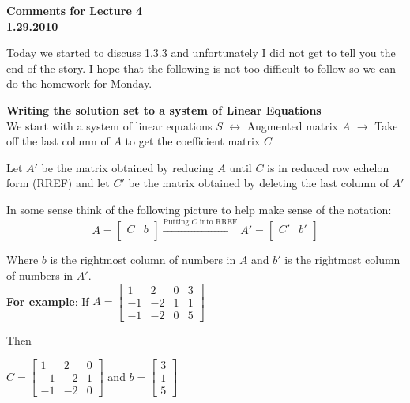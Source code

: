 \documentclass[12pt]{article}
\begin{document}
\begin{center}
{\large \bf Comments for Lecture 4}\\
\bf{1.29.2010}
\end{center}


Today we started to discuss 1.3.3 and unfortunately I did not get to tell you the end of the story.  I hope that the following is not too difficult to follow so we can do the homework for Monday.  


\begin{center}
{\bf Writing the solution set to a system of Linear Equations}\\

We start with a system of linear equations $S$ $\longleftrightarrow$ Augmented matrix $A$ $\rightarrow$ Take off the last column of $A$ to get the coefficient matrix $C$
\end{center}

Let $A'$ be the matrix obtained by reducing $A$ until $C$ is in reduced row echelon form (RREF) and let $C'$ be the matrix obtained by deleting the last column of $A'$

In some sense think of the following picture to help make sense of the notation:
\[ A = \left[ \begin {array}{c|c} C & b\\\end {array} \right] \xrightarrow[]{\text{Putting }C \text{ into RREF}} A' = \left[ \begin {array}{c|c} C' & b'\\\end {array} \right] \]

Where $b$ is the rightmost column of numbers in $A$ and $b'$ is the rightmost column of numbers in $A'$.\\

{\bf For example}:
If $A= \left[ \begin {array}{ccc|c} 1&2&0&3\\ -1&-2&1&1
\\ -1&-2&0&5\end {array} \right]$

Then
\begin{center}
$C= \left[ \begin {array}{ccc} 1&2&0\\ -1&-2&1
\\ -1&-2&0\end {array} \right]$ and $b=\left[ \begin {array}{c} 3\\ 1
\\ 5\end {array} \right]$
\end{center}
\end{document}
